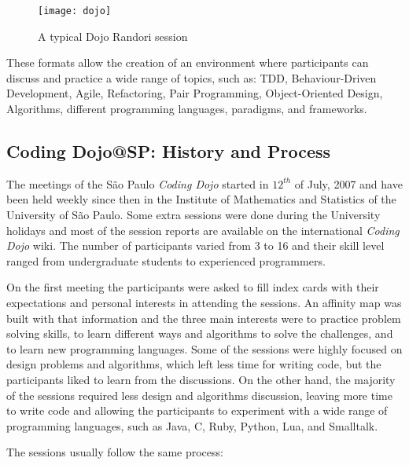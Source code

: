 \begin{figure}[htp]
\centering
\texttt{[image: dojo]}
\caption{A typical Dojo Randori session}\label{fig:dojo}
\end{figure}

These formats allow the creation of an environment where participants
can discuss and practice a wide range of topics, such as: TDD,
Behaviour-Driven Development, Agile, Refactoring, Pair Programming,
Object-Oriented Design, Algorithms, different programming languages,
paradigms, and frameworks.

\subsection{Coding Dojo@SP: History and Process}\label{subsec:dojosp}

The meetings of the São Paulo \emph{Coding Dojo} started in $12^{th}$
of July, 2007 and have been held weekly since then in the Institute of
Mathematics and Statistics of the University of São Paulo. Some extra
sessions were done during the University holidays and most of the
session reports are available on the international \emph{Coding Dojo}
wiki\cite{DojoWiki}. The number of participants varied from 3 to 16
and their skill level ranged from undergraduate students to
experienced programmers.

On the first meeting the participants were asked to fill index cards
with their expectations and personal interests in attending the
sessions. An affinity map was built with that information and the
three main interests were to practice problem solving skills, to learn
different ways and algorithms to solve the challenges, and to learn
new programming languages. Some of the sessions were highly focused on
design problems and algorithms, which left less time for writing code,
but the participants liked to learn from the discussions. On the other
hand, the majority of the sessions required less design and algorithms
discussion, leaving more time to write code and allowing the
participants to experiment with a wide range of programming languages,
such as Java, C, Ruby, Python, Lua, and Smalltalk.

The sessions usually follow the same process:


